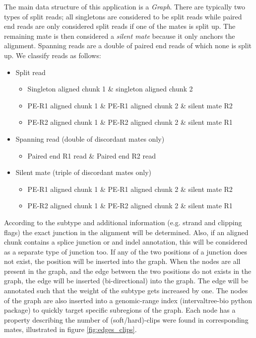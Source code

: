 \documentclass{article}
\theoremstyle{definition}
\begin{document}
The main data structure of this application is a \textit{Graph}. There are typically two types of split reads; all singletons are considered to be split reads while paired end reads are only considered split reads if one of the mates is split up.
The remaining mate is then considered a \textit{silent mate} because it only anchors the alignment.
Spanning reads are a double of paired end reads of which none is split up. We classify reads as follows:
\begin{itemize}
	\item Split read
	\begin{itemize}
		\item Singleton aligned chunk 1 \& singleton aligned chunk 2
		\item PE-R1 aligned chunk 1 \& PE-R1 aligned chunk 2 \& silent mate R2
		\item PE-R2 aligned chunk 1 \& PE-R2 aligned chunk 2 \& silent mate R1
	\end{itemize}
	\item Spanning read (double of discordant mates only)
	\begin{itemize}
		\item Paired end R1 read \& Paired end R2 read
	\end{itemize}
	\item Silent mate (triple of discordant mates only)
	\begin{itemize}
		\item PE-R1 aligned chunk 1 \& PE-R1 aligned chunk 2 \& silent mate R2
		\item PE-R2 aligned chunk 1 \& PE-R2 aligned chunk 2 \& silent mate R1
	\end{itemize}
\end{itemize}

According to the subtype and additional information (e.g. strand and clipping flags) the exact junction in the alignment will be determined.
Also, if an aligned chunk contains a splice junction or and indel annotation, this will be considered as a separate type of junction too.
If any of the two positions of a junction does not exist, the position will be inserted into the graph.
When the nodes are all present in the graph, and the edge between the two positions do not exists in the graph, the edge will be inserted (bi-directional) into the graph.
The edge will be annotated such that the weight of the subtype gets increased by one.
The nodes of the graph are also inserted into a genomic-range index (intervaltree-bio python package) to quickly target specific subregions of the graph.
Each node has a property describing the number of (soft/hard)-clips were found in corresponding mates, illustrated in figure \ref{fig:edges_clips}.
\end{document}
